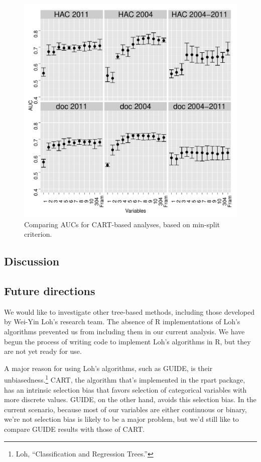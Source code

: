 \documentclass[11pt,]{article}
\let\rmarkdownfootnote\footnote%
\def\footnote{\protect\rmarkdownfootnote}
\begin{document}
\begin{figure}[htbp]
\centering
\includegraphics{from-mike/rpartcv_minsplit.pdf}
\caption{Comparing AUCs for CART-based analyses, based on min-split criterion.}
\label{figure:auc-ms}
\end{figure}

\subsection{Discussion}\label{discussion}

\subsection{Future directions}\label{future-directions}

We would like to investigate other tree-based methods, including those
developed by Wei-Yin Loh's research team. The absence of R
implementations of Loh's algorithms prevented us from including them in
our current analysis. We have begun the process of writing code to
implement Loh's algorithms in R, but they are not yet ready for use.


A major reason for using Loh's algorithms, such as GUIDE, is their
unbiasedness.\footnote{Loh, ``Classification and Regression Trees.'' }
CART, the algorithm that's implemented in the rpart package, has an
intrinsic selection bias that favors selection of categorical variables
with more discrete values. GUIDE, on the other hand, avoids this
selection bias. In the current scenario, because most of our variables
are either continuous or binary, we're not selection bias is likely to
be a major problem, but we'd still like to compare GUIDE results with
those of CART.
\end{document}
